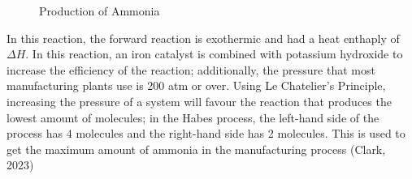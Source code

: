 \begin{figure}[htp]
    \centering
    
    \caption{Production of Ammonia}
    \label{fig:enter-label}
\end{figure}

In this reaction, the forward reaction is exothermic and had a heat enthaply of \begin{math}\Delta H \end{math}. In this reaction, an iron catalyst is combined with potassium hydroxide to increase the efficiency of the reaction; additionally, the pressure that most manufacturing plants use is 200 atm or over. Using Le Chatelier’s Principle, increasing the pressure of a system will favour the reaction that produces the lowest amount of molecules; in the Habes process, the left-hand side of the process has 4 molecules and the right-hand side has 2 molecules. This is used to get the maximum amount of ammonia in the manufacturing process (Clark, 2023)

